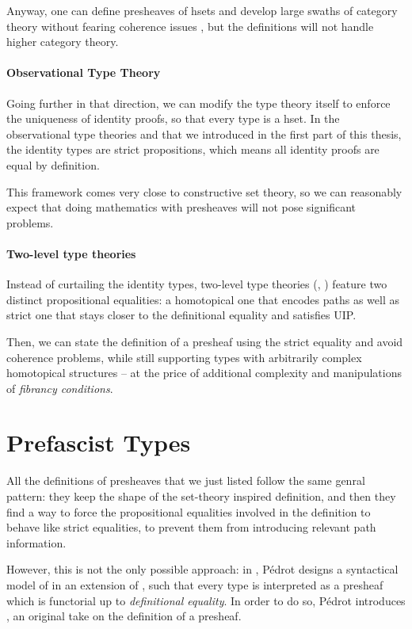 Anyway, one can define presheaves of hsets and develop large swaths of category
theory without fearing coherence issues , but the definitions
will not handle higher category theory.

\paragraph{Observational Type Theory}
% 
Going further in that direction, we can modify the type theory itself to 
enforce the uniqueness of identity proofs, so that every type is a hset.
% 
In the observational type theories \SetoidTT and \SetoidCC that we introduced 
in the first part of this thesis, the identity types are strict propositions,
which means all identity proofs are equal by definition.

This framework comes very close to constructive set theory, so we can
reasonably expect that doing mathematics with presheaves will not pose 
significant problems.

\paragraph{Two-level type theories}
% 
Instead of curtailing the identity types, two-level type theories 
(, )
feature two distinct propositional equalities: a homotopical one that encodes 
paths as well as strict one that stays closer to the definitional equality and
satisfies UIP.

Then, we can state the definition of a presheaf using the strict equality
and avoid coherence problems, while still supporting types with arbitrarily
complex homotopical structures -- at the price of additional complexity
and manipulations of \emph{fibrancy conditions}.

\section{Prefascist Types}

All the definitions of presheaves that we just listed follow the same genral
pattern: they keep the shape of the set-theory inspired definition, and
then they find a way to force the propositional equalities involved in the
definition to behave like strict equalities, \ie to prevent them from 
introducing relevant path information. 

However, this is not the only possible approach: 
% 
in , Pédrot designs a syntactical model of \CIC in
an extension of \CIC, such that every type is interpreted as a presheaf which
is functorial up to \emph{definitional equality}. 
% 
In order to do so, Pédrot introduces , an original
take on the definition of a presheaf.

